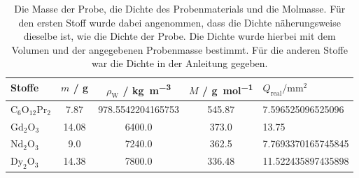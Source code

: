 \begin{table}\caption{Die Masse der Probe, die Dichte des Probenmaterials und die Molmasse. Für den ersten Stoff wurde dabei angenommen, dass die Dichte näherungsweise dieselbe ist, wie die Dichte der Probe. Die Dichte wurde hierbei mit dem Volumen und der angegebenen Probenmasse bestimmt. Für die anderen Stoffe war die Dichte in der Anleitung gegeben.}
\label{tab2}
\centering
{}
\begin{tabular}{l S S S} 
\toprule
{Stoffe} & {$m$ / \si{\gram}} & {$\rho_\text{W}$ / \si[per-mode=fraction]{\kilo\gram\per\cubic\meter}} & {$M$ / \si[per-mode=fraction]{\gram\per\mol}} & {$Q_\text{real} / \si{\milli\meter\squared}$}\\
\midrule
$\text{C}_6 \text{O}_{12} \text{Pr}_2$  & 7.87 & 978.5542204165753 & 545.87  & 7.596525096525096\\
$\text{Gd}_2 \text{O}_3$         & 14.08 & 6400.0 & 373.0             & 13.75\\
$\text{Nd}_2 \text{O}_3$         & 9.0 & 7240.0 & 362.5               & 7.7693370165745845\\
$\text{Dy}_2 \text{O}_3$         & 14.38 & 7800.0 & 336.48            & 11.522435897435898\\
\bottomrule
\end{tabular}\end{table}